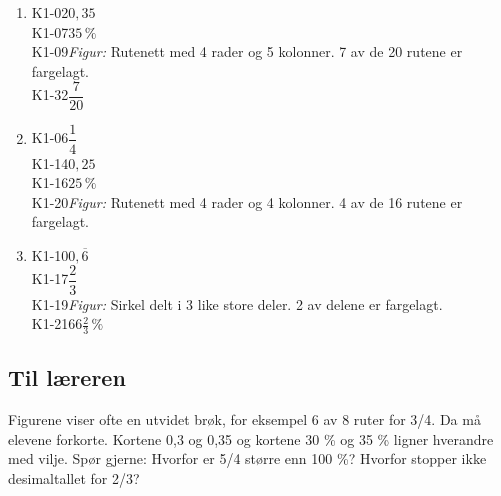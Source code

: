 \documentclass[11pt,a4paper]{article}
\begin{document}
\begin{enumerate}[leftmargin=1.6em, itemsep=0.7em]
\item \begin{minipage}[t]{\linewidth}\textsf{\small K1-02}\quad $0{,}35$ \\ \textsf{\small K1-07}\quad $35\,\%$ \\ \textsf{\small K1-09}\quad \emph{Figur:} Rutenett med 4 rader og 5 kolonner. 7 av de 20 rutene er fargelagt. \\ \textsf{\small K1-32}\quad $\dfrac{7}{20}$\end{minipage}
\item \begin{minipage}[t]{\linewidth}\textsf{\small K1-06}\quad $\dfrac{1}{4}$ \\ \textsf{\small K1-14}\quad $0{,}25$ \\ \textsf{\small K1-16}\quad $25\,\%$ \\ \textsf{\small K1-20}\quad \emph{Figur:} Rutenett med 4 rader og 4 kolonner. 4 av de 16 rutene er fargelagt.\end{minipage}
\item \begin{minipage}[t]{\linewidth}\textsf{\small K1-10}\quad $0{,}\overline{6}$ \\ \textsf{\small K1-17}\quad $\dfrac{2}{3}$ \\ \textsf{\small K1-19}\quad \emph{Figur:} Sirkel delt i 3 like store deler. 2 av delene er fargelagt. \\ \textsf{\small K1-21}\quad $66\tfrac{2}{3}\,\%$\end{minipage}
\end{enumerate}
\subsection*{Til læreren}
Figurene viser ofte en utvidet brøk, for eksempel 6 av 8 ruter for 3/4. Da må elevene forkorte. Kortene 0,3 og 0,35 og kortene 30 \% og 35 \% ligner hverandre med vilje. Spør gjerne: Hvorfor er 5/4 større enn 100 \%? Hvorfor stopper ikke desimaltallet for 2/3?
\end{document}
